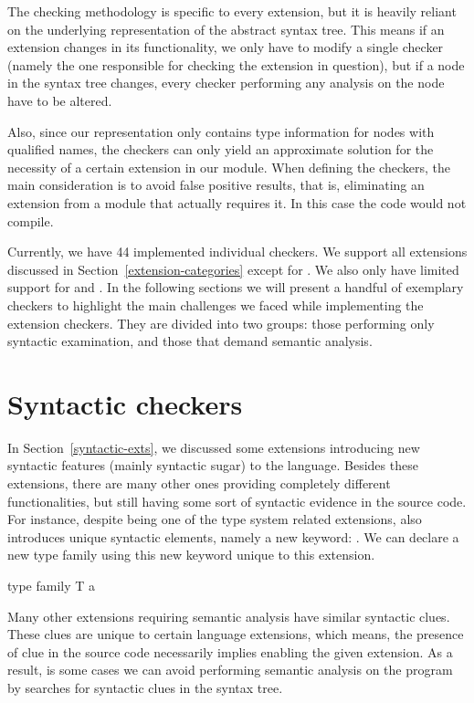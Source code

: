 \documentclass[main.tex]{subfiles}
\begin{document}
	
	The checking methodology is specific to every extension, but it is heavily reliant on the underlying representation of the abstract syntax tree. This means if an extension changes in its functionality, we only have to modify a single checker (namely the one responsible for checking the extension in question), but if a node in the syntax tree changes, every checker performing any analysis on the node have to be altered.
	
	Also, since our representation only contains type information for nodes with qualified names, the checkers can only yield an approximate solution for the necessity of a certain extension in our module. When defining the checkers, the main consideration is to avoid false positive results, that is, eliminating an extension from a module that actually requires it. In this case the code would not compile.
	
	Currently, we have 44 implemented individual checkers. We support all extensions discussed in Section~\ref{extension-categories} except for . We also only have limited support for  and . In the following sections we will present a handful of exemplary checkers to highlight the main challenges we faced while implementing the extension checkers. They are divided into two groups: those performing only syntactic examination, and those that demand semantic analysis. 
	
	\section{Syntactic checkers}
	
	In Section~\ref{syntactic-exts}, we discussed some extensions introducing new syntactic features (mainly syntactic sugar) to the language. Besides these extensions, there are many other ones providing completely different functionalities, but still having some sort of syntactic evidence in the source code. For instance, despite being one of the type system related extensions,  also introduces unique syntactic elements, namely a new keyword: . We can declare a new type family using this new keyword unique to this extension.
	
	\begin{oneLineHaskell}
		type family T a
	\end{oneLineHaskell}
	
	Many other extensions requiring semantic analysis have similar syntactic clues. These clues are unique to certain language extensions, which means, the presence of clue in the source code necessarily implies enabling the given extension. As a result, is some cases we can avoid performing semantic analysis on the program by searches for syntactic clues in the syntax tree.
	
\end{document}
